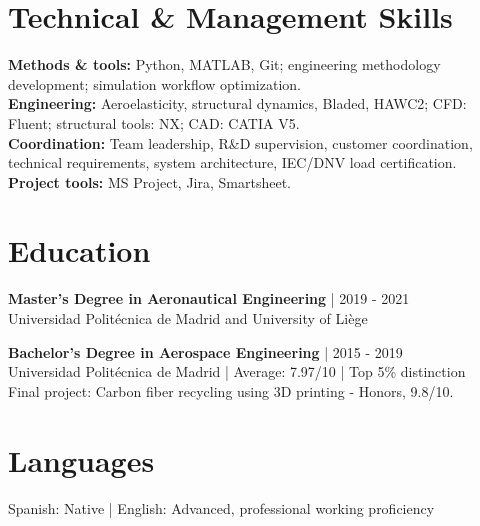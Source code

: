 \section{Technical \& Management Skills}
\textbf{Methods \& tools:} Python, MATLAB, Git; engineering methodology development; simulation workflow optimization.\\
\textbf{Engineering:} Aeroelasticity, structural dynamics, Bladed, HAWC2; CFD: Fluent; structural tools: NX; CAD: CATIA V5.\\
\textbf{Coordination:} Team leadership, R\&D supervision, customer coordination, technical requirements, system architecture, IEC/DNV load certification.\\
\textbf{Project tools:} MS Project, Jira, Smartsheet.
\section{Education}
\textbf{Master's Degree in Aeronautical Engineering} | 2019 - 2021\\
Universidad Politécnica de Madrid and University of Liège\par
\textbf{Bachelor's Degree in Aerospace Engineering} | 2015 - 2019\\
Universidad Politécnica de Madrid | Average: 7.97/10 | Top 5\% distinction\\
Final project: Carbon fiber recycling using 3D printing - Honors, 9.8/10.
\section{Languages}
Spanish: Native | English: Advanced, professional working proficiency

